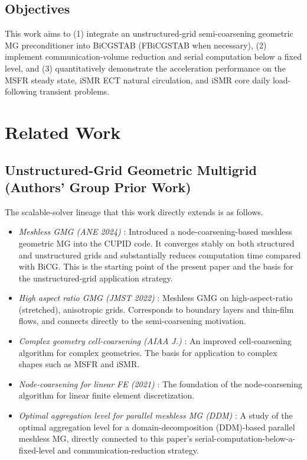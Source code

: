 \documentclass[review]{elsarticle}
\begin{document}
\subsection{Objectives}
This work aims to (1) integrate an unstructured-grid semi-coarsening geometric MG preconditioner into BiCGSTAB (FBiCGSTAB when necessary), (2) implement communication-volume reduction and serial computation below a fixed level, and (3) quantitatively demonstrate the acceleration performance on the MSFR steady state, iSMR ECT natural circulation, and iSMR core daily load-following transient problems.

\section{Related Work}
\label{Section:RelatedWork}

\subsection{Unstructured-Grid Geometric Multigrid (Authors' Group Prior Work)}
The scalable-solver lineage that this work directly extends is as follows.
\begin{itemize}
  \item \emph{Meshless GMG (ANE 2024)} \cite{do2024meshless}: Introduced a node-coarsening-based meshless geometric MG into the CUPID code. It converges stably on both structured and unstructured grids and substantially reduces computation time compared with BiCG. This is the starting point of the present paper and the basis for the unstructured-grid application strategy.
  \item \emph{High aspect ratio GMG (JMST 2022)} \cite{do2022highaspect}: Meshless GMG on high-aspect-ratio (stretched), anisotropic grids. Corresponds to boundary layers and thin-film flows, and connects directly to the semi-coarsening motivation.
  \item \emph{Complex geometry cell-coarsening (AIAA J.)} \cite{ha2024aiaa}: An improved cell-coarsening algorithm for complex geometries. The basis for application to complex shapes such as MSFR and iSMR.
  \item \emph{Node-coarsening for linear FE (2021)} \cite{ha2021nodecoarsening}: The foundation of the node-coarsening algorithm for linear finite element discretization.
  \item \emph{Optimal aggregation level for parallel meshless MG (DDM)} \cite{ha2025aggregation}: A study of the optimal aggregation level for a domain-decomposition (DDM)-based parallel meshless MG, directly connected to this paper's serial-computation-below-a-fixed-level and communication-reduction strategy.
\end{itemize}
\end{document}
